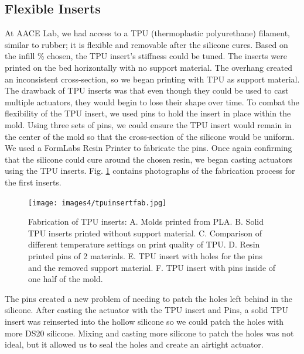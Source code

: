 \subsection{Flexible Inserts}
At AACE Lab, we had access to a TPU (thermoplastic polyurethane) filament, similar to rubber; it is flexible and removable after the silicone cures. Based on the infill \% chosen, the TPU insert's stiffness could be tuned. The inserts were printed on the bed horizontally with no support material. The overhang created an inconsistent cross-section, so we began printing with TPU as support material. The drawback of TPU inserts was that even though they could be used to cast multiple actuators, they would begin to lose their shape over time. To combat the flexibility of the TPU insert, we used pins to hold the insert in place within the mold. Using three sets of pins, we could ensure the TPU insert would remain in the center of the mold so that the cross-section of the silicone would be uniform. We used a FormLabs Resin Printer to fabricate the pins. Once again confirming that the silicone could cure around the chosen resin, we began casting actuators using the TPU inserts. Fig. \ref{fig:tpuinsert} contains photographs of the fabrication process for the first inserts. 

\begin{figure}[ht]
    \centering
    \texttt{[image: images4/tpuinsertfab.jpg]}
    \caption{Fabrication of TPU inserts: A. Molds printed from PLA. B. Solid TPU inserts printed without support material. C. Comparison of different temperature settings on print quality of TPU. D. Resin printed pins of 2 materials. E. TPU insert with holes for the pins and the removed support material. F. TPU insert with pins inside of one half of the mold.}
    \label{fig:tpuinsert}
\end{figure}

The pins created a new problem of needing to patch the holes left behind in the silicone. After casting the actuator with the TPU insert and Pins, a solid TPU insert was reinserted into the hollow silicone so we could patch the holes with more DS20 silicone. Mixing and casting more silicone to patch the holes was not ideal, but it allowed us to seal the holes and create an airtight actuator. 

\clearpage
